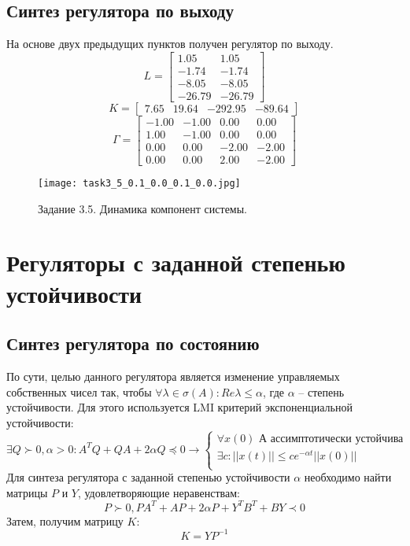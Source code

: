 \subsection{Синтез регулятора по выходу}
На основе двух предыдущих пунктов получен регулятор по выходу.
\[L = \begin{bmatrix}
    1.05 &  1.05\\
   -1.74 & -1.74\\
   -8.05 & -8.05\\
   -26.79 & -26.79
  \end{bmatrix}\]
  \[K = \begin{bmatrix}
    7.65 &  19.64 & -292.95 & -89.64
  \end{bmatrix}\]
  \[\Gamma = \begin{bmatrix}
   -1.00 & -1.00 &  0.00 &  0.00\\
    1.00 & -1.00 &  0.00 &  0.00\\
    0.00 &  0.00 & -2.00 & -2.00\\
    0.00 &  0.00 &  2.00 & -2.00
  \end{bmatrix}\]

      \begin{figure}
        \centering
        \texttt{[image: task3\_5\_0.1\_0.0\_0.1\_0.0.jpg]}
        \caption{Задание 3.5. Динамика компонент системы.}
        \label{fig:task3_5.jpg}
\end{figure}



\section{Регуляторы с заданной степенью устойчивости}

\subsection{Синтез регулятора по состоянию}
По сути, целью данного регулятора является изменение управляемых собственных чисел так, чтобы \(\forall \lambda \in \sigma(A): Re{\lambda} \leq \alpha\), где \(\alpha\) -- степень устойчивости.
Для этого используется LMI критерий экспоненциальной устойчивости:
\[ \exists Q \succ 0 , \alpha > 0 :  A^TQ + QA + 2 \alpha Q \preccurlyeq 0 \rightarrow
\begin{cases}
    \text{\(\forall x(0)\) А ассимптотически устойчива}\\
    \exists c :  ||x(t)|| \le  c e^{-\alpha t} ||x(0)|| \\
\end{cases}
\]
Для синтеза регулятора с заданной степенью устойчивости $\alpha$ необходимо найти матрицы $P$ и $Y$,
удовлетворяющие неравенствам:
\begin{equation}
    P \succ 0, PA^T + AP +2\alpha P + Y^TB^T + BY \prec 0
\end{equation}
Затем, получим матрицу $K$:
\begin{equation}
    K = YP^{-1}
\end{equation}

